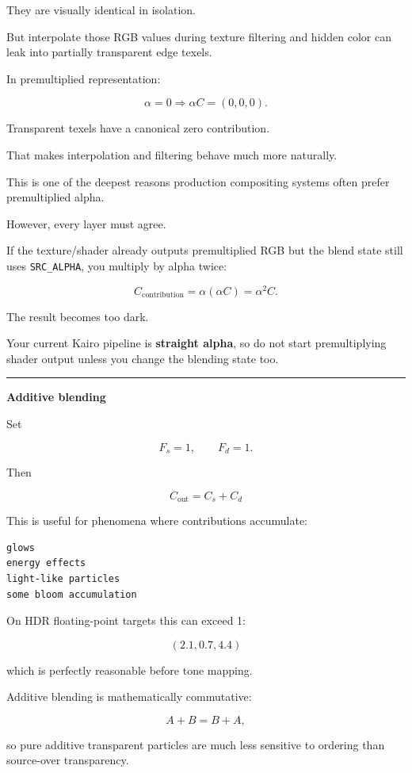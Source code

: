 They are visually identical in isolation.

But interpolate those RGB values during texture filtering and hidden color can leak into partially transparent edge texels.

In premultiplied representation:

\[
\alpha=0
\Rightarrow
\alpha C=(0,0,0).
\]

Transparent texels have a canonical zero contribution.

That makes interpolation and filtering behave much more naturally.

This is one of the deepest reasons production compositing systems often prefer premultiplied alpha.

However, every layer must agree.

If the texture/shader already outputs premultiplied RGB but the blend state still uses \texttt{SRC\_ALPHA}, you multiply by alpha twice:

\[
C_{\text{contribution}}
=
\alpha(\alpha C)
=
\alpha^2C.
\]

The result becomes too dark.

Your current Kairo pipeline is \textbf{straight alpha}, so do not start premultiplying shader output unless you change the blending state too.

\begin{center}\rule{0.5\linewidth}{0.5pt}\end{center}

\textbf{Additive blending}

Set

\[
F_s=1,\qquad F_d=1.
\]

Then

\[
\boxed{
C_{\text{out}}=C_s+C_d
}
\]

This is useful for phenomena where contributions accumulate:

\begin{verbatim}
glows
energy effects
light-like particles
some bloom accumulation
\end{verbatim}

On HDR floating-point targets this can exceed 1:

\[
(2.1,0.7,4.4)
\]

which is perfectly reasonable before tone mapping.

Additive blending is mathematically commutative:

\[
A+B=B+A,
\]

so pure additive transparent particles are much less sensitive to ordering than source-over transparency.

